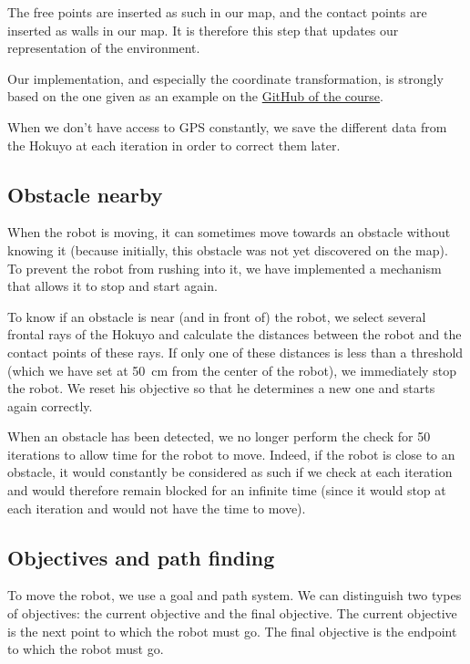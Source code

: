 \documentclass[a4paper, 10pt, conference]{ieeeconf}
\begin{document}
    The free points are inserted as such in our map, and the contact points are inserted as walls in our map. It is therefore this step that updates our representation of the environment.
    
    Our implementation, and especially the coordinate transformation, is strongly based on the one given as an example on the \href{https://github.com/ULgRobotics/trs}{GitHub of the course}.
    
    When we don't have access to GPS constantly, we save the different data from the Hokuyo at each iteration in order to correct them later.
    
    \subsection{Obstacle nearby}
    
    When the robot is moving, it can sometimes move towards an obstacle without knowing it (because initially, this obstacle was not yet discovered on the map). To prevent the robot from rushing into it, we have implemented a mechanism that allows it to stop and start again.
    
    To know if an obstacle is near (and in front of) the robot, we select several frontal rays of the Hokuyo and calculate the distances between the robot and the contact points of these rays. If only one of these distances is less than a threshold (which we have set at \SI{50}{\centi\meter} from the center of the robot), we immediately stop the robot. We reset his objective so that he determines a new one and starts again correctly.
    
    When an obstacle has been detected, we no longer perform the check for \num{50} iterations to allow time for the robot to move. Indeed, if the robot is close to an obstacle, it would constantly be considered as such if we check at each iteration and would therefore remain blocked for an infinite time (since it would stop at each iteration and would not have the time to move).
    
    \subsection{Objectives and path finding}
    
    To move the robot, we use a goal and path system. We can distinguish two types of objectives: the current objective and the final objective. The current objective is the next point to which the robot must go. The final objective is the endpoint to which the robot must go.
    
\end{document}
